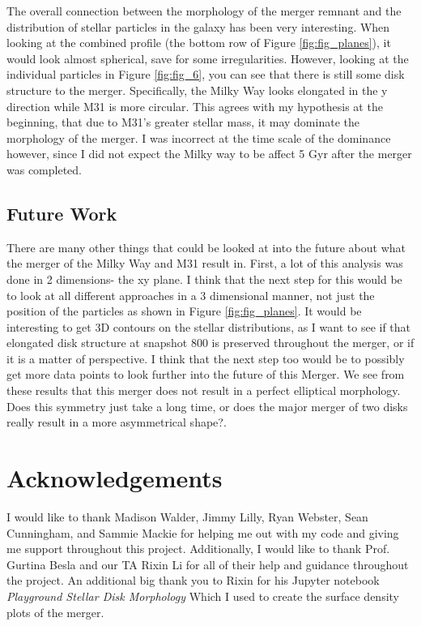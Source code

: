 \documentclass{aastex63}
\begin{document}
The overall connection between the morphology of the merger remnant and the distribution of stellar particles in the galaxy has been very interesting. When looking at the combined profile (the bottom row of Figure \ref{fig:fig_planes}), it would look almost spherical, save for some irregularities. However, looking at the individual particles in Figure \ref{fig:fig_6}, you can see that there is still some disk structure to the merger. Specifically, the Milky Way looks elongated in the y direction while M31 is more circular. This agrees with my hypothesis at the beginning, that due to M31's greater stellar mass, it may dominate the morphology of the merger. I was incorrect at the time scale of the dominance however, since I did not expect the Milky way to be affect 5 Gyr after the merger was completed. 


\subsection{Future Work}

There are many other things that could be looked at into the future about what the merger of the Milky Way and M31 result in. First, a lot of this analysis was done in 2 dimensions- the xy plane. I think that the next step for this would be to look at all different approaches in a 3 dimensional manner, not just the position of the particles as shown in Figure \ref{fig:fig_planes}. It would be interesting to get 3D contours on the stellar distributions, as I want to see if that elongated disk structure at snapshot 800 is preserved throughout the merger, or if it is a matter of perspective. I think that the next step too would be to possibly get more data points to look further into the future of this Merger. We see from these results that this merger does not result in a perfect elliptical morphology. Does this symmetry just take a long time, or does the major merger of two disks really result in a more asymmetrical shape?. 

\section{Acknowledgements}

I would like to thank Madison Walder, Jimmy Lilly, Ryan Webster, Sean Cunningham, and Sammie Mackie for helping me out with my code and giving me support throughout this project. Additionally, I would like to thank Prof. Gurtina Besla and our TA Rixin Li for all of their help and guidance throughout the project. An additional big thank you to Rixin for his Jupyter notebook \textit{Playground Stellar Disk Morphology} Which I used to create the surface density plots of the merger. 
\end{document}
